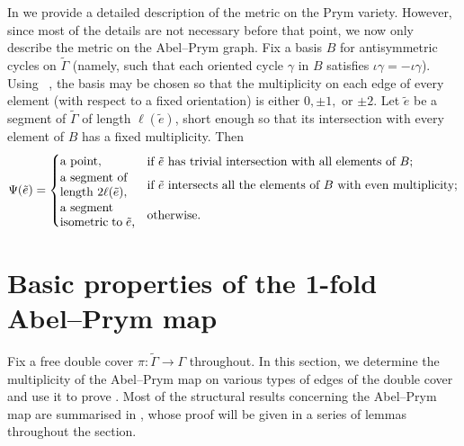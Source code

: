 \documentclass[11pt]{article}
\theoremstyle{definition}
\numberwithin{equation}{section}
\theoremstyle{definition}
\newcommand{\wt}[1]{\widetilde{#1}}
\begin{document}
In  we  provide a detailed description of the metric on the Prym variety. However, since most of the details are not necessary before that point, we now only describe the metric  on the Abel--Prym graph. Fix a basis $B$ for antisymmetric cycles on $\wt\Gamma$ (namely, such that each oriented cycle  $\gamma$ in $B$ satisfies $\iota\gamma = -\iota\gamma$). Using ~\cite[Construction B]{LZ22}, the basis may be chosen so that the multiplicity on each edge of every element  (with respect to a fixed orientation) is either $0,\pm 1,$ or  $\pm 2$.  Let $\tilde e$ be a segment of $\wt\Gamma$ of length $\ell(\tilde e)$, short enough so that its  intersection with every element of $B$ has a fixed multiplicity. Then 
\begin{equation}\label{eq:PrymMetric}
\Psi(\tilde e) = 
\begin{cases}
 \text{\parbox{0.85in}{a point,}} & \text{if $\tilde e$ has trivial intersection with all elements of $B$;} \\[2pt]

 \text{\parbox{0.85in}{a segment of \\ length $2\ell(\tilde e)$,}} & \text{if $\tilde e$ intersects all the elements of $B$ with even multiplicity;}\\[8pt]

 \text{\parbox{0.85in}{a segment \\ isometric to $\tilde e$,}} & \text{otherwise.}
 
\end{cases}
\end{equation}

\section{Basic properties  of the 1-fold Abel--Prym map}
\label{sec:behaviourofAP}

Fix a free double cover $\pi:\wt\Gamma\to\Gamma$ throughout. 
In this section, we determine the  multiplicity of the Abel--Prym map on various types of edges of the double cover and use it to prove . Most of the structural results concerning the Abel--Prym map are summarised in 
, whose proof will be given in a series of lemmas throughout the section. 
 
\end{document}
